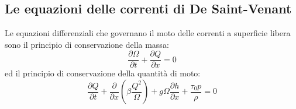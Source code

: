 \documentclass[12pt]{article} %
\begin{document}
\subsection{Le equazioni delle correnti di De Saint-Venant}
\noindent Le equazioni differenziali che governano il moto delle correnti a superficie libera sono il principio di conservazione della massa:
\begin{equation}
    \frac{\partial \Omega }{\partial t}+\frac{\partial Q}{\partial x}=0
    \label{eqn:cons_massa}
\end{equation}
\noindent ed il principio di conservazione della quantità di moto:
\begin{equation}
    \frac{\partial Q }{\partial t}+\frac{\partial}{\partial x}\left(\beta\frac{Q^2}{\Omega}\right)+g\Omega\frac{\partial h}{\partial x}+\frac{\tau_0p}{\rho}=0
    \label{eqn:cons_q_moto}
\end{equation}

\newpage
\end{document}
